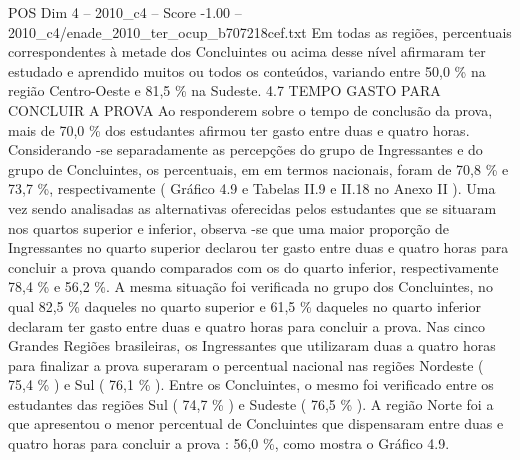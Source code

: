 \begin{textsample}{POS Dim 4 – 2010\_c4 – Score -1.00 – 2010\_c4/enade\_2010\_ter\_ocup\_b707218cef.txt}
Em todas as regiões, percentuais correspondentes à metade dos Concluintes ou acima desse nível afirmaram ter estudado e aprendido muitos ou todos os conteúdos, variando entre 50,0 \% na região Centro-Oeste e 81,5 \% na Sudeste. 4.7 TEMPO GASTO PARA CONCLUIR A PROVA Ao responderem sobre o tempo de conclusão da prova, mais de 70,0 \% dos estudantes afirmou ter gasto entre duas e quatro horas.
Considerando -se separadamente as percepções do grupo de Ingressantes e do grupo de Concluintes, os percentuais, em em termos nacionais, foram de 70,8 \% e 73,7 \%, respectivamente ( Gráfico 4.9 e Tabelas II.9 e II.18 no Anexo II ).
Uma vez sendo analisadas as alternativas oferecidas pelos estudantes que se situaram nos quartos superior e inferior, observa -se que uma maior proporção de Ingressantes no quarto superior declarou ter gasto entre duas e quatro horas para concluir a prova quando comparados com os do quarto inferior, respectivamente 78,4 \% e 56,2 \%.
A mesma situação foi verificada no grupo dos Concluintes, no qual 82,5 \% daqueles no quarto superior e 61,5 \% daqueles no quarto inferior declaram ter gasto entre duas e quatro horas para concluir a prova.
Nas cinco Grandes Regiões brasileiras, os Ingressantes que utilizaram duas a quatro horas para finalizar a prova superaram o percentual nacional nas regiões Nordeste ( 75,4 \% ) e Sul ( 76,1 \% ).
Entre os Concluintes, o mesmo foi verificado entre os estudantes das regiões Sul ( 74,7 \% ) e Sudeste ( 76,5 \% ).
A região Norte foi a que apresentou o menor percentual de Concluintes que dispensaram entre duas e quatro horas para concluir a prova : 56,0 \%, como mostra o Gráfico 4.9.

\end{textsample}
